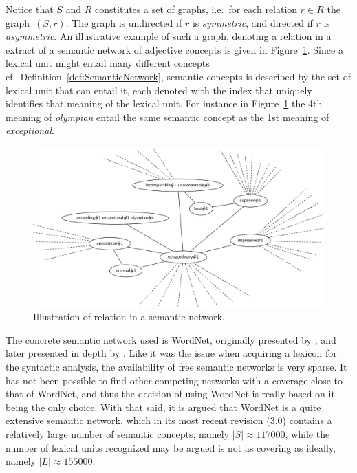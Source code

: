 Notice that $S$ and $R$ constitutes a set of graphs, i.e.\ for each relation $r \in R$ the graph~$(S,r)$. The graph is undirected if $r$ is \emph{symmetric}, and directed if $r$ is \emph{asymmetric}. An illustrative example of such a graph, denoting a relation in a extract of a semantic network of adjective concepts is given in Figure~\ref{fig:semanticNetwork}.  Since a lexical unit might entail many different concepts cf.\ Definition~\ref{def:SemanticNetwork}, semantic concepts is described by the set of lexical unit that can entail it, each denoted with the index that uniquely identifies that meaning of the lexical unit. For instance in Figure~\ref{fig:semanticNetwork} the 4th meaning of \emph{olympian} entail the same semantic concept as the 1st meaning of \emph{exceptional}.

\begin{figure}[ht]
  \center
  \includegraphics[scale=.27]{Figures/Exceptional}
  \caption{Illustration of relation in a semantic network.}
  \label{fig:semanticNetwork}
\end{figure}

The concrete semantic network used is WordNet, originally presented by \citeauthor{wordnet} , and later presented in depth by \citeauthor{wordnetBook} . Like it was the issue when acquiring a lexicon for the syntactic analysis, the availability of free semantic networks is very sparse. It has not been possible to find other competing networks with a coverage close to that of WordNet, and thus the decision of using WordNet is really based on it being the only choice. With that said, it is argued that WordNet is a quite extensive semantic network, which in its most recent revision (3.0) contains a relatively large number of semantic concepts, namely $|S| \approx \num{117000}$, while the number of lexical units recognized may be argued is not as covering as ideally, namely $|L| \approx \num{155000}$.

